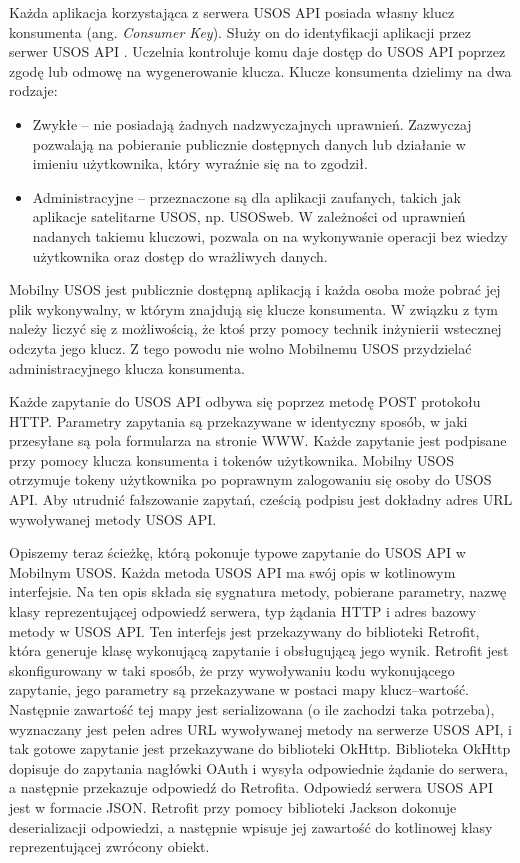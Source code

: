 \documentclass{pracamgr}
\begin{document}
Każda aplikacja korzystająca z serwera USOS API posiada własny klucz konsumenta
(ang. \textit{Consumer Key}). Służy on do identyfikacji aplikacji przez serwer
USOS API \cite{usosapi-auth}. Uczelnia kontroluje komu daje dostęp do USOS API
poprzez zgodę lub odmowę na wygenerowanie klucza. Klucze konsumenta dzielimy na
dwa rodzaje:
\begin{itemize}
	\item Zwykłe -- nie posiadają żadnych nadzwyczajnych uprawnień. Zazwyczaj
	pozwalają na pobieranie publicznie dostępnych danych lub działanie w imieniu
	użytkownika, który wyraźnie się na to zgodził.
	\item Administracyjne -- przeznaczone są dla aplikacji zaufanych, takich jak
	aplikacje satelitarne USOS, np. USOSweb. W zależności od uprawnień nadanych
	takiemu kluczowi, pozwala on na wykonywanie operacji bez wiedzy użytkownika
	oraz dostęp do wrażliwych danych.
\end{itemize}
Mobilny USOS jest publicznie dostępną aplikacją i każda osoba może pobrać jej
plik wykonywalny, w którym znajdują się klucze konsumenta. W związku z tym należy
liczyć się z możliwością, że ktoś przy pomocy technik inżynierii wstecznej odczyta
jego klucz. Z tego powodu nie wolno Mobilnemu USOS przydzielać administracyjnego
klucza konsumenta.

Każde zapytanie do USOS API odbywa się poprzez metodę POST protokołu HTTP.
Parametry zapytania są przekazywane w identyczny sposób, w jaki przesyłane są
pola formularza na stronie WWW. Każde zapytanie jest podpisane przy pomocy klucza
konsumenta i tokenów użytkownika. Mobilny USOS otrzymuje tokeny użytkownika po
poprawnym zalogowaniu się osoby do USOS API. Aby utrudnić fałszowanie zapytań,
cześcią podpisu jest dokładny adres URL wywoływanej metody USOS API.

Opiszemy teraz ścieżkę, którą pokonuje typowe zapytanie do USOS API w Mobilnym USOS.
Każda metoda USOS API ma swój opis w kotlinowym interfejsie. Na ten opis składa
się sygnatura metody, pobierane parametry, nazwę klasy reprezentującej odpowiedź
serwera, typ żądania HTTP i adres bazowy metody w USOS API. Ten interfejs jest
przekazywany do biblioteki Retrofit, która generuje klasę wykonującą zapytanie i
obsługującą jego wynik. Retrofit jest skonfigurowany w taki sposób, że przy
wywoływaniu kodu wykonującego zapytanie, jego parametry są przekazywane w postaci
mapy klucz--wartość. Następnie zawartość tej mapy jest serializowana (o ile zachodzi
taka potrzeba), wyznaczany jest pełen adres URL wywoływanej metody na serwerze USOS
API, i tak gotowe zapytanie jest przekazywane do biblioteki OkHttp. Biblioteka
OkHttp dopisuje do zapytania nagłówki OAuth i wysyła odpowiednie żądanie do serwera,
a następnie przekazuje odpowiedź do Retrofita. Odpowiedź serwera USOS API jest w
formacie JSON. Retrofit przy pomocy biblioteki Jackson dokonuje deserializacji
odpowiedzi, a następnie wpisuje jej zawartość do kotlinowej klasy reprezentującej
zwrócony obiekt.
\end{document}
